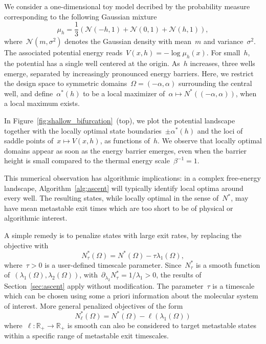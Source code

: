 \documentclass[a4]{article}
\newcommand{\R}{\mathbb{R}}
\newcommand{\1}{\mathbbm 1}
\begin{document}
We consider a one-dimensional toy model decribed by the probability measure corresponding to the following Gaussian mixture
\begin{equation}
    \label{eq:gaussian_mixture}
    \mu_h = \frac{1}{3}\left(\mathcal{N}(-h,1) + \mathcal{N}(0,1) + \mathcal{N}(h,1)\right),
\end{equation}
where~$\mathcal{N}(m,\sigma^2)$ denotes the Gaussian density with mean~$m$ and variance~$\sigma^2$. The associated potential energy reads~$V(x,h) = -\log \mu_h(x)$. For small~$h$, the potential has a single well centered at the origin. As~$h$ increases, three wells emerge, separated by increasingly pronounced energy barriers. Here, we restrict the design space to symmetric domains~$\Omega = (-\alpha, \alpha)$ surrounding the central well, and define~$\alpha^*(h)$ to be a local maximizer of~$\alpha \mapsto N^*((-\alpha,\alpha))$, when a local maximum exists.

In Figure~\ref{fig:shallow_bifurcation}~(top), we plot the potential landscape together with the locally optimal state boundaries~$\pm\alpha^*(h)$ and the loci of saddle points of~$x\mapsto V(x,h)$, as functions of~$h$. We observe that locally optimal domains appear as soon as the energy barrier emerges, even when the barrier height is small compared to the thermal energy scale~$\beta^{-1}=1$.

This numerical observation has algorithmic implications: in a complex free-energy landscape, Algorithm~\ref{alg:ascent} will typically identify local optima around every well. The resulting states, while locally optimal in the sense of~$N^*$, may have mean metastable exit times which are too short to be of physical or algorithmic interest.

A simple remedy is to penalize states with large exit rates, by replacing the objective with
\begin{equation}
    \label{eq:penalized_objective}
    N^*_\tau(\Omega) = N^*(\Omega) - \tau \lambda_1(\Omega),
\end{equation}
where~$\tau > 0$ is a user-defined timescale parameter. Since~$N^*_\tau$ is a smooth function of~$(\lambda_1(\Omega), \lambda_2(\Omega))$, with~$\partial_{\lambda_2} N^*_\tau = 1/\lambda_1 > 0$, the results of Section~\ref{sec:ascent} apply without modification. The parameter~$\tau$ is a timescale which can be chosen using some a priori information about the molecular system of interest.
More general penalized objectives of the form
\begin{equation}
    N^*_\ell(\Omega)=N^*(\Omega) - \ell(\lambda_1(\Omega))
\end{equation}
where~$\ell:\R_+\to\R_+$ is smooth can also be considered to target metastable states within a specific range of metastable exit timescales.
\end{document}
